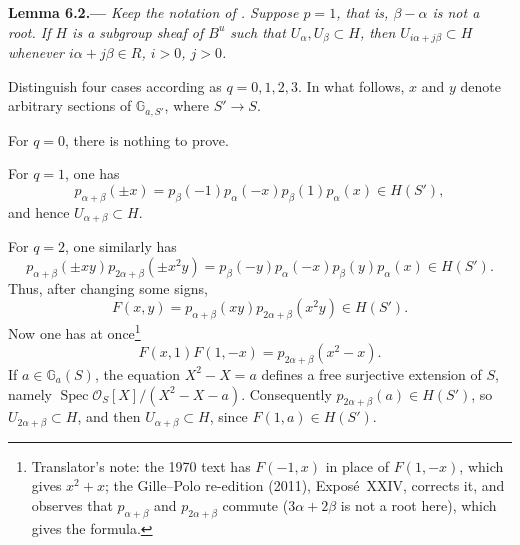 \par\medskip\noindent{}\textbf{Lemma 6.2.---}\enspace
\emph{Keep the notation of .  Suppose \(p=1\), that is,
\(\beta-\alpha\) is not a root.  If \(H\) is a subgroup sheaf of
\(B^u\) such that \(U_\alpha,U_\beta\subset H\), then
\(U_{i\alpha+j\beta}\subset H\) whenever
\(i\alpha+j\beta\in R\), \(i>0\), \(j>0\).}

Distinguish four cases according as \(q=0,1,2,3\).  In what follows,
\(x\) and \(y\) denote arbitrary sections of
\(\mathbb G_{a,S'}\), where \(S'\to S\).

For \(q=0\), there is nothing to prove.

For \(q=1\), one has
\[
 p_{\alpha+\beta}(\pm x)
 =p_\beta(-1)p_\alpha(-x)p_\beta(1)p_\alpha(x)\in H(S'),
\]
and hence \(U_{\alpha+\beta}\subset H\).

For \(q=2\), one similarly has
\[
 p_{\alpha+\beta}(\pm xy)
 p_{2\alpha+\beta}(\pm x^2y)
 =p_\beta(-y)p_\alpha(-x)p_\beta(y)p_\alpha(x)\in H(S').
\]
Thus, after changing some signs,
\[
 F(x,y)=p_{\alpha+\beta}(xy)p_{2\alpha+\beta}(x^2y)\in H(S').
\]
Now one has at once\footnote{Translator's note: the 1970 text has
\(F(-1,x)\) in place of \(F(1,-x)\), which gives \(x^2+x\); the Gille--Polo re-edition (2011),
Exposé~XXIV, corrects it, and observes that \(p_{\alpha+\beta}\) and \(p_{2\alpha+\beta}\) commute
(\(3\alpha+2\beta\) is not a root here), which gives the formula.}
\[
 F(x,1)F(1,-x)=p_{2\alpha+\beta}(x^2-x).
\]
If \(a\in\mathbb G_a(S)\), the equation \(X^2-X=a\) defines a free
surjective extension of \(S\), namely
\(\operatorname{Spec}\mathcal O_S[X]/(X^2-X-a)\).  Consequently
\(p_{2\alpha+\beta}(a)\in H(S')\), so
\(U_{2\alpha+\beta}\subset H\), and then
\(U_{\alpha+\beta}\subset H\), since \(F(1,a)\in H(S')\).


